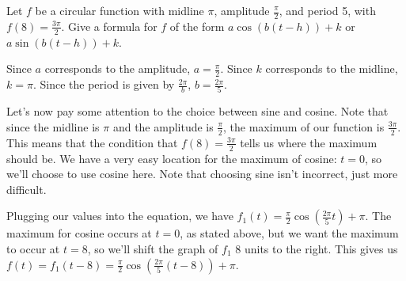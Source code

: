 \documentclass{ximera}
\begin{document}
\begin{example}
Let $f$ be a circular function with midline $\pi$, amplitude $\frac{\pi}{2}$, and period 5, with $f(8) = \frac{3\pi}{2}$. Give a formula for $f$ of the form $a\cos(b(t - h)) + k$ or $a\sin(b(t - h)) + k$.

\begin{explanation}
Since $a$ corresponds to the amplitude, $a = \frac{\pi}{2}$. Since $k$ corresponds to the midline, $k = \pi$. Since the period is given by $\frac{2\pi}{b}$, $b = \frac{2\pi}{5}$. 

Let's now pay some attention to the choice between sine and cosine. Note that since the midline is $\pi$ and the amplitude is $\frac{\pi}{2}$, the maximum of our function is $\frac{3\pi}{2}$. This means that the condition that $f(8) = \frac{3\pi}{2}$ tells us where the maximum should be. We have a very easy location for the maximum of cosine: $t = 0$, so we'll choose to use cosine here. Note that choosing sine isn't incorrect, just more difficult.

Plugging our values into the equation, we have $f_1(t) = \frac{\pi}{2}\cos\left(\frac{2\pi}{5}t\right) + \pi$. The maximum for cosine occurs at $t = 0$, as stated above, but we want the maximum to occur at $t = 8$, so we'll shift the graph of $f_1$ 8 units to the right. This gives us $f(t) = f_1(t - 8) =  \frac{\pi}{2}\cos\left(\frac{2\pi}{5}(t - 8)\right) + \pi$.
\end{explanation}
\end{example}
\end{document}
